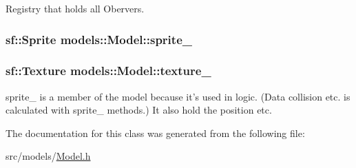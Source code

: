 \-Registry that holds all \-Obervers. 

\hypertarget{classmodels_1_1Model_a5d3856c0bb519b2926d1cbfcb54d2bfe}{
\subsubsection[{sprite\-\_\-}]{\setlength{\rightskip}{0pt plus 5cm}sf\-::\-Sprite {\bf models\-::\-Model\-::sprite\-\_\-}}}\label{dd/db5/classmodels_1_1Model_a5d3856c0bb519b2926d1cbfcb54d2bfe}
\hypertarget{classmodels_1_1Model_a3e56b29353979d719b3ca9efbac66cfd}{
\subsubsection[{texture\-\_\-}]{\setlength{\rightskip}{0pt plus 5cm}sf\-::\-Texture {\bf models\-::\-Model\-::texture\-\_\-}}}\label{dd/db5/classmodels_1_1Model_a3e56b29353979d719b3ca9efbac66cfd}


sprite\-\_\- is a member of the model because it's used in logic. (\-Data collision etc. is calculated with sprite\-\_\- methods.) \-It also hold the position etc. 



\-The documentation for this class was generated from the following file\-:\begin{DoxyCompactItemize}
\item 
src/models/\hyperlink{Model_8h}{\-Model.\-h}\end{DoxyCompactItemize}

